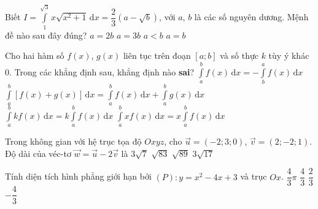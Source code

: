 \begin{ex}%
	Biết $I=\displaystyle\int\limits_1^{\sqrt{3}}x\sqrt{x^2+1}\mathrm{\,d}x=\dfrac{2}{3}\left(a-\sqrt{b}\right)$, với $a$, $b$ là các số nguyên dương. Mệnh đề nào sau đây đúng?
	\choice
	{\True $a=2b$}
	{$a=3b$}
	{$a<b$}
	{$a=b$}
\end{ex}
\begin{ex}%
	Cho hai hàm số $f(x)$, $g(x)$ liên tục trên đoạn $[a;b]$ và số thực $k$ tùy ý khác $0$. Trong các khẳng định sau, khẳng định nào \textbf{sai}?
	\choice
	{$\displaystyle\int\limits_a^bf(x)\mathrm{\,d}x=-\displaystyle\int\limits_b^af(x)\mathrm{\,d}x$}
	{$\displaystyle\int\limits_a^b\left[f(x)+g(x)\right]\mathrm{\,d}x=\displaystyle\int\limits_a^bf(x)\mathrm{\,d}x+\displaystyle\int\limits_a^bg(x)\mathrm{\,d}x$}
	{ $\displaystyle\int\limits_a^bkf(x)\mathrm{\,d}x=k\displaystyle\int\limits_a^bf(x)\mathrm{\,d}x$}
	{\True $\displaystyle\int\limits_a^bxf(x)\mathrm{\,d}x=x\displaystyle\int\limits_a^bf(x)\mathrm{\,d}x$}
\end{ex}
\begin{ex}%
	Trong không gian với hệ trục tọa độ $Oxyz$, cho $\overrightarrow{u}=(-2;3;0)$, $\overrightarrow{v}=(2;-2;1)$. Độ dài của véc-tơ $\overrightarrow{w}=\overrightarrow{u}-2\overrightarrow{v}$ là
	\choice
	{$3\sqrt{7}$}
	{$\sqrt{83}$}
	{\True $\sqrt{89}$}
	{$3\sqrt{17}$}
\end{ex}
\begin{ex}%
	Tính diện tích hình phẳng giới hạn bởi $(P)\colon y=x^2-4x+3$ và trục $Ox$. 
	\choice
	{$\dfrac{4}{3}\pi$}
	{\True $\dfrac{4}{3}$}
	{$\dfrac{2}{3}$}
	{$-\dfrac{4}{3}$}
\end{ex}
